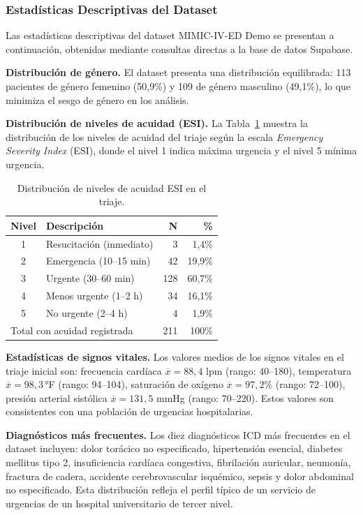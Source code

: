 \subsubsection{Estadísticas Descriptivas del Dataset}

Las estadísticas descriptivas del dataset MIMIC-IV-ED Demo se presentan a continuación, obtenidas mediante consultas directas a la base de datos Supabase.

\textbf{Distribución de género.} El dataset presenta una distribución equilibrada: 113 pacientes de género femenino (50,9\%) y 109 de género masculino (49,1\%), lo que minimiza el sesgo de género en los análisis.

\textbf{Distribución de niveles de acuidad (ESI).} La Tabla~\ref{tab:acuidad} muestra la distribución de los niveles de acuidad del triaje según la escala \textit{Emergency Severity Index} (ESI), donde el nivel 1 indica máxima urgencia y el nivel 5 mínima urgencia.

\begin{table}[H]
\centering
\caption{Distribución de niveles de acuidad ESI en el triaje.}
\label{tab:acuidad}
\footnotesize
\begin{tabularx}{\columnwidth}{clrr}
\toprule
\textbf{Nivel} & \textbf{Descripción} & \textbf{N} & \textbf{\%} \\
\midrule
1 & Resucitación (inmediato) & 3 & 1,4\% \\
2 & Emergencia (10--15 min) & 42 & 19,9\% \\
3 & Urgente (30--60 min) & 128 & 60,7\% \\
4 & Menos urgente (1--2 h) & 34 & 16,1\% \\
5 & No urgente (2--4 h) & 4 & 1,9\% \\
\midrule
\multicolumn{2}{l}{Total con acuidad registrada} & 211 & 100\% \\
\bottomrule
\end{tabularx}
\end{table}

\textbf{Estadísticas de signos vitales.} Los valores medios de los signos vitales en el triaje inicial son: frecuencia cardíaca $\overline{x} = 88{,}4$ lpm (rango: 40--180), temperatura $\overline{x} = 98{,}3$\,°F (rango: 94--104), saturación de oxígeno $\overline{x} = 97{,}2$\% (rango: 72--100), presión arterial sistólica $\overline{x} = 131{,}5$ mmHg (rango: 70--220). Estos valores son consistentes con una población de urgencias hospitalarias.

\textbf{Diagnósticos más frecuentes.} Los diez diagnósticos ICD más frecuentes en el dataset incluyen: dolor torácico no especificado, hipertensión esencial, diabetes mellitus tipo 2, insuficiencia cardíaca congestiva, fibrilación auricular, neumonía, fractura de cadera, accidente cerebrovascular isquémico, sepsis y dolor abdominal no especificado. Esta distribución refleja el perfil típico de un servicio de urgencias de un hospital universitario de tercer nivel.

